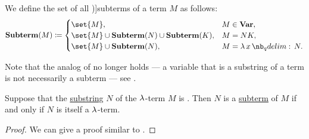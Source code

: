 \begin{definition}\label{def:lambda_subterm}
  We define the set of all \term[ru=подтерм (\cite[189]{Герасимов2011})]{subterms} of a term \( M \) as follows:
  \begin{equation*}
    \op*{Subterm}(M) \coloneqq \begin{cases}
      \set{ M },                                             &M \in \op*{Var}, \\
      \set{ M } \cup \op*{Subterm}(N) \cup \op*{Subterm}(K), &M = N K, \\
      \set{ M } \cup \op*{Subterm}(N),                       &M = \qabs x N.
    \end{cases}
  \end{equation*}
\end{definition}
\begin{comments}
  \item Note that the analog of  no longer holds --- a variable that is a substring of a term is not necessarily a subterm --- see .
\end{comments}

\begin{proposition}\label{thm:lambda_subterm_characterization}
  Suppose that the \hyperref[def:formal_language/substring]{substring} \( N \) of the \( \mathrm{\lambda} \)-term \( M \) is . Then \( N \) is a \hyperref[def:lambda_subterm]{subterm} of \( M \) if and only if \( N \) is itself a \( \mathrm{\lambda} \)-term.
\end{proposition}
\begin{proof}
  We can give a proof similar to .
\end{proof}

